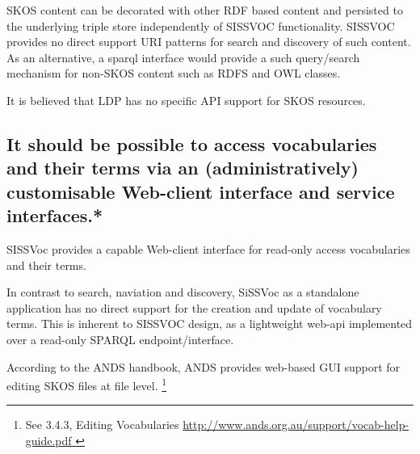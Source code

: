 \documentclass[10pt,a4paper]{article}
\begin{document}
\begin{flushleft}
  SKOS content can be decorated with other RDF based
content and persisted to the underlying triple store independently of SISSVOC
functionality. SISSVOC provides
no direct support URI patterns for search and discovery of such content. As an
alternative, a sparql interface would provide a
such query/search mechanism for non-SKOS content such as RDFS and OWL classes. 

It is believed that LDP has no specific API support for SKOS resources.

% 
% 
% 

  \subsection{
  It should be possible to access vocabularies and their terms via an 
  (administratively) customisable Web-client interface and service interfaces.* } 


  SISSVoc provides a capable Web-client interface for read-only access vocabularies and their terms.

  In contrast to search, naviation and discovery, SiSSVoc as a standalone application has no direct 
  support for the creation and update of vocabulary terms. This is inherent to SISSVOC design, as a 
  lightweight web-api implemented over a read-only SPARQL endpoint/interface.  

%    
  According to the ANDS handbook, ANDS provides web-based GUI support for editing SKOS files at file level. 
  \footnote { See 3.4.3, Editing Vocabularies \url{ http://www.ands.org.au/support/vocab-help-guide.pdf } 
  }


\end{flushleft}
\end{document}
